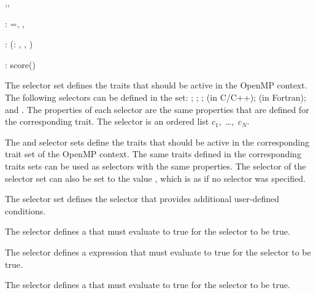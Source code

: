 \begin{ompSyntax}
\plc{trait-set-selector[},\plc{trait-set-selector[},\plc{...]]}

:
   ={\plc{trait-selector[}, \plc{trait-selector[}, \plc{...]]}}

:
   \plc{trait-selector-name[}(\plc{[trait-score}: \plc{]} \plc{trait-property[}, \plc{trait-property[}, \plc{...]]})\plc{]}

:
    score()
\end{ompSyntax}

The  selector set defines the  traits that should
be active in the OpenMP context. The following selectors can be defined in the
 set: ; ; ; 
(in C/C++);  (in Fortran); and . The properties of each
selector are the same properties that are defined for the corresponding trait.
The  selector is an ordered list $c_{1}$,~\ldots,~$c_{N}$.

The  and  selector sets define the traits that
should be active in the corresponding trait set of the OpenMP context. The
same traits defined in the corresponding traits sets can be used as selectors
with the same properties. The  selector of the 
selector set can also be set to the value , which is as if no
 selector was specified.

The  selector set defines the  selector that provides 
additional user-defined conditions.

\begin{cspecific}
The \code{)} selector defines a  that must evaluate to true for the selector to be true.
\end{cspecific}

\begin{cppspecific}
The \code{)} selector defines a  
expression that must evaluate to true for the selector to be true.
\end{cppspecific}

\begin{fortranspecific}
The \code{)} selector defines a  that must evaluate to true for the selector to be true.
\end{fortranspecific}

